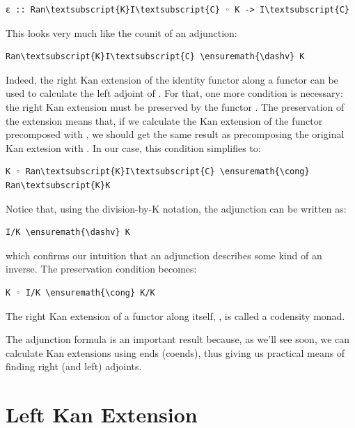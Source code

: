 \begin{Verbatim}[commandchars=\\\{\}]
ε :: Ran\textsubscript{K}I\textsubscript{C} ◦ K -> I\textsubscript{C}
\end{Verbatim}
This looks very much like the counit of an adjunction:

\begin{Verbatim}[commandchars=\\\{\}]
Ran\textsubscript{K}I\textsubscript{C} \ensuremath{\dashv} K
\end{Verbatim}
Indeed, the right Kan extension of the identity functor along a functor
 can be used to calculate the left adjoint of . For
that, one more condition is necessary: the right Kan extension must be
preserved by the functor . The preservation of the extension
means that, if we calculate the Kan extension of the functor precomposed
with , we should get the same result as precomposing the
original Kan extesion with . In our case, this condition
simplifies to:

\begin{Verbatim}[commandchars=\\\{\}]
K ◦ Ran\textsubscript{K}I\textsubscript{C} \ensuremath{\cong} Ran\textsubscript{K}K
\end{Verbatim}
Notice that, using the division-by-K notation, the adjunction can be
written as:

\begin{Verbatim}[commandchars=\\\{\}]
I/K \ensuremath{\dashv} K
\end{Verbatim}
which confirms our intuition that an adjunction describes some kind of
an inverse. The preservation condition becomes:

\begin{Verbatim}[commandchars=\\\{\}]
K ◦ I/K \ensuremath{\cong} K/K
\end{Verbatim}
The right Kan extension of a functor along itself, , is
called a codensity monad.

The adjunction formula is an important result because, as we'll see
soon, we can calculate Kan extensions using ends (coends), thus giving
us practical means of finding right (and left) adjoints.

\section{Left Kan Extension}\label{left-kan-extension}

